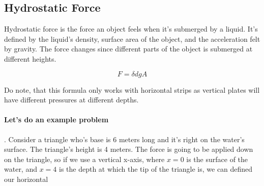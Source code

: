 \subsection{Hydrostatic Force}

Hydrostatic force is the force an object feels when it's submerged by a liquid. It's defined 
by the liquid's density, surface area of the object, and the acceleration felt by gravity. The force changes since different parts of the object is submerged at different heights. 

\begin{equation}
	F = \delta dgA
\end{equation}

Do note, that this formula only works with horizontal strips as vertical plates will have different pressures at different depths.  

\paragraph*{Let's do an example problem}. Consider a triangle who's base is 6 meters long and it's right on the water's surface. The triangle's height is 4 meters. The force is going to be applied down on the triangle, so if we use a vertical x-axis, where $x=0$ is the surface of the water, and $x=4$ is the depth at which the tip of the triangle is, we can defined our horizontal 